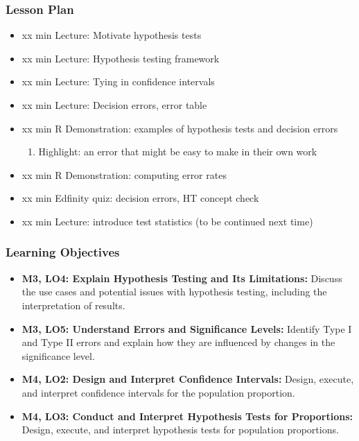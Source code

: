 \begin{frame}
    \frametitle{Lesson Plan}
    \begin{itemize}
        \item xx min Lecture: Motivate hypothesis tests
        \item xx min Lecture: Hypothesis testing framework
        \item xx min Lecture: Tying in confidence intervals
        \item xx min Lecture: Decision errors, error table
        \item xx min R Demonstration: examples of hypothesis tests and decision errors
        \begin{enumerate}
            \item Highlight: an error that might be easy to make in their own work
        \end{enumerate}
        \item xx min R Demonstration: computing error rates
        \item xx min Edfinity quiz: decision errors, HT concept check
        \item xx min Lecture: introduce test statistics (to be continued next time)
    \end{itemize}
\end{frame}
            
\begin{frame}
    \frametitle{Learning Objectives}
    \begin{itemize}
        \item \textbf{M3, LO4: Explain Hypothesis Testing and Its Limitations:} Discuss the use cases and potential issues with hypothesis testing, including the interpretation of results.
        \item \textbf{M3, LO5: Understand Errors and Significance Levels:} Identify Type I and Type II errors and explain how they are influenced by changes in the significance level.
        \item \textbf{M4, LO2: Design and Interpret Confidence Intervals:} Design, execute, and interpret confidence intervals for the population proportion.
        \item \textbf{M4, LO3: Conduct and Interpret Hypothesis Tests for Proportions:} Design, execute, and interpret hypothesis tests for population proportions.
    \end{itemize}
\end{frame}
    
    